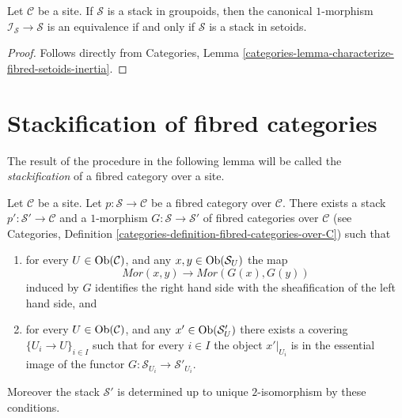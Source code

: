 \begin{lemma}
\label{lemma-characterize-stack-in-setoids}
Let $\mathcal{C}$ be a site.
If $\mathcal{S}$ is a stack in groupoids, then the
canonical $1$-morphism $\mathcal{I}_\mathcal{S} \to \mathcal{S}$
is an equivalence if and only if $\mathcal{S}$ is a stack in setoids.
\end{lemma}

\begin{proof}
Follows directly from
Categories, Lemma \ref{categories-lemma-characterize-fibred-setoids-inertia}.
\end{proof}




\section{Stackification of fibred categories}
\label{section-stackify}

\noindent
The result of the procedure in the following lemma will be called the
{\it stackification} of a fibred category over a site.

\begin{lemma}
\label{lemma-stackify}
Let $\mathcal{C}$ be a site.
Let $p : \mathcal{S} \to \mathcal{C}$ be a fibred category over $\mathcal{C}$.
There exists a stack $p' : \mathcal{S}' \to \mathcal{C}$ and a
$1$-morphism $G : \mathcal{S} \to \mathcal{S}'$
of fibred categories over $\mathcal{C}$ (see
Categories, Definition \ref{categories-definition-fibred-categories-over-C})
such that
\begin{enumerate}
\item for every $U \in \mathop{\mathrm{Ob}}\nolimits(\mathcal{C})$, and any
$x, y \in \mathop{\mathrm{Ob}}\nolimits(\mathcal{S}_U)$ the map
$$
\mathit{Mor}(x, y) \longrightarrow \mathit{Mor}(G(x), G(y))
$$
induced by $G$ identifies the right hand side with the sheafification
of the left hand side, and
\item for every $U \in \mathop{\mathrm{Ob}}\nolimits(\mathcal{C})$, and any
$x' \in \mathop{\mathrm{Ob}}\nolimits(\mathcal{S}'_U)$ there exists a covering
$\{U_i \to U\}_{i \in I}$ such that for every $i \in I$ the
object $x'|_{U_i}$ is in the essential image of the
functor $G : \mathcal{S}_{U_i} \to \mathcal{S}'_{U_i}$.
\end{enumerate}
Moreover the stack $\mathcal{S}'$ is determined up to unique
$2$-isomorphism by these conditions.
\end{lemma}

